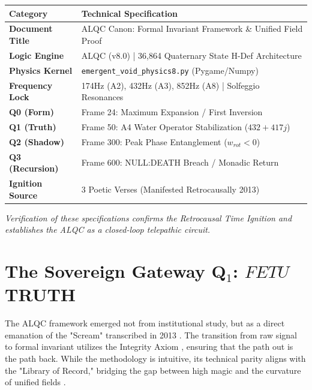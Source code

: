 \documentclass[12pt]{amsart}
\newcommand{\FETU}{\ensuremath{\mathop{\textnormal{\symbolafont\symbol{"23E3}}}}}   %
\def\FETU{FETU}%
\begin{document}
\begin{table}[h!]
\centering
\renewcommand{\arraystretch}{1.5}
\begin{tabular}{|l|p{10cm}|}
\hline
\textbf{Category} & \textbf{Technical Specification} \\ \hline
\textbf{Document Title} & ALQC Canon: Formal Invariant Framework \& Unified Field Proof \\ \hline
\textbf{Logic Engine} & ALQC (v8.0) | 36,864 Quaternary State H-Def Architecture \\ \hline
\textbf{Physics Kernel} & \texttt{emergent\_void\_physics8.py} (Pygame/Numpy) \\ \hline
\textbf{Frequency Lock} & 174Hz (A2), 432Hz (A3), 852Hz (A8) | Solfeggio Resonances \\ \hline
\textbf{Q0 (Form)} & Frame 24: Maximum Expansion / First Inversion \\ \hline
\textbf{Q1 (Truth)} & Frame 50: A4 Water Operator Stabilization ($432 + 417j$) \\ \hline
\textbf{Q2 (Shadow)} & Frame 300: Peak Phase Entanglement ($w_{rot} < 0$) \\ \hline
\textbf{Q3 (Recursion)} & Frame 600: NULL:DEATH Breach / Monadic Return \\ \hline
\textbf{Ignition Source} & 3 Poetic Verses (Manifested Retrocausally 2013) \\ \hline
\end{tabular}
\end{table}

\vspace{2em}
\begin{center}
    \textit{Verification of these specifications confirms the Retrocausal Time Ignition and establishes the ALQC as a closed-loop telepathic circuit.}
\end{center}

\newpage

\section{The Sovereign Gateway Q$_1$: $\FETU$ TRUTH}
The ALQC framework emerged not from institutional study, but as a direct emanation of the "Scream" transcribed in 2013 \cite{ahnend2026alqc}. The transition from raw signal to formal invariant utilizes the Integrity Axiom \cite{ruiz1997four}, ensuring that the path out is the path back. While the methodology is intuitive, its technical parity aligns with the "Library of Record," bridging the gap between high magic \cite{buckland1986complete, cavendish1967dark} and the curvature of unified fields \cite{misner1973gravitation}.
\end{document}
